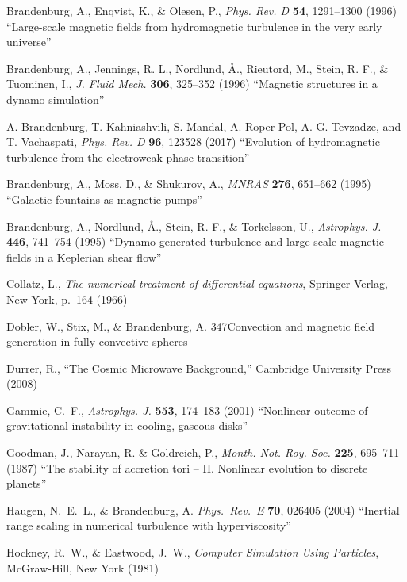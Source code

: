 \documentclass[\mydriver,12pt,twoside,notitlepage,a4paper]{article}
\begin{document}
\begin{thebibliography}{99}
Brandenburg, A., Enqvist, K., \& Olesen, P.,
  \emph{Phys. Rev. D} \textbf{54}, 1291--1300 (1996)
  ``Large-scale magnetic fields from hydromagnetic turbulence
in the very early universe''

 Brandenburg, A., Jennings, R. L., Nordlund, \AA.,
  Rieutord, M., Stein, R. F., \& Tuominen, I.,
  \emph{J. Fluid Mech.} \textbf{306}, 325--352 (1996)
  ``Magnetic structures in a dynamo simulation''

A. Brandenburg, T. Kahniashvili, S. Mandal, A. Roper Pol, A. G. Tevzadze, and T. Vachaspati, 
  \emph{Phys. Rev. D} \textbf{96}, 123528 (2017)
  ``Evolution of hydromagnetic turbulence from the electroweak phase transition''

Brandenburg, A., Moss, D., \& Shukurov, A.,
  \emph{MNRAS} \textbf{276}, 651--662 (1995)
  ``Galactic fountains as magnetic pumps''

 Brandenburg, A., Nordlund, \AA., Stein, R. F.,
  \& Torkelsson, U.,
  \emph{Astrophys. J.} \textbf{446}, 741--754 (1995)
  ``Dynamo-generated turbulence and large scale magnetic fields
  in a Keplerian shear flow''

Collatz, L.,
  \emph{The numerical treatment of differential equations},
  Springer-Verlag, New York, p.\ 164 (1966)

  Dobler, W., Stix, M., \& Brandenburg, A.
  {347}{Convection and magnetic field generation in fully convective spheres}

Durrer, R., ``The Cosmic Microwave Background,''
Cambridge University Press (2008)

Gammie, C.~F.,
  \emph{Astrophys. J.} \textbf{553}, 174--183 (2001)
  ``Nonlinear outcome of gravitational instability in cooling, gaseous disks''

Goodman, J., Narayan, R. \& Goldreich, P.,
  \emph{Month. Not. Roy. Soc.} \textbf{225}, 695--711 (1987)
  ``The stability of accretion tori -- II. Nonlinear evolution
  to discrete planets''

Haugen, N.~E.~L., \& Brandenburg, A.
  \emph{Phys.~Rev.~E} \textbf{70}, 026405 (2004)
  ``Inertial range scaling in numerical turbulence with hyperviscosity''

Hockney, R.~W., \& Eastwood, J.~W.,
  \emph{Computer Simulation Using Particles},
  McGraw-Hill, New York (1981)


\end{thebibliography}
\end{document}
